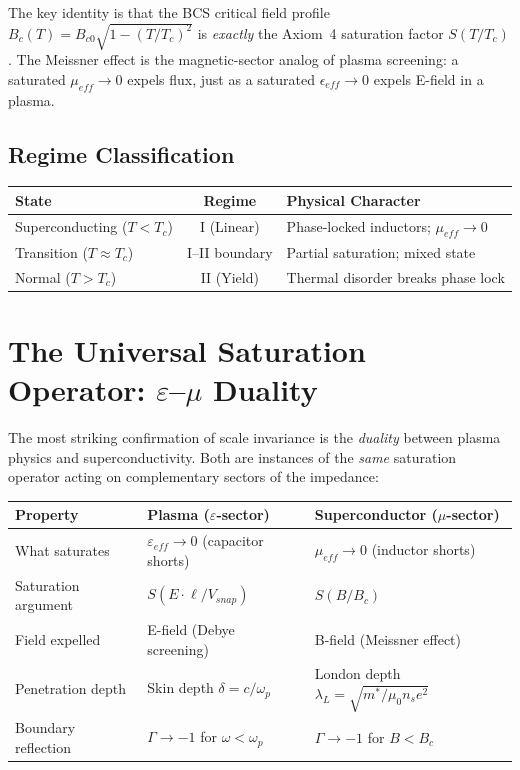 \noindent The key identity is that the BCS critical field profile $B_c(T) = B_{c0}\sqrt{1-(T/T_c)^2}$ is \emph{exactly} the Axiom~4 saturation factor $S(T/T_c)$. The Meissner effect is the magnetic-sector analog of plasma screening: a saturated $\mu_{eff} \to 0$ expels flux, just as a saturated $\epsilon_{eff} \to 0$ expels E-field in a plasma.

\subsection*{Regime Classification}
\begin{center}
\small
\renewcommand{\arraystretch}{1.2}
\begin{tabular}{lcl}
\toprule
\textbf{State} & \textbf{Regime} & \textbf{Physical Character} \\
\midrule
Superconducting ($T < T_c$) & I (Linear) & Phase-locked inductors; $\mu_{eff} \to 0$ \\
Transition ($T \approx T_c$)      & I--II boundary & Partial saturation; mixed state \\
Normal ($T > T_c$)                 & II (Yield) & Thermal disorder breaks phase lock \\
\bottomrule
\end{tabular}
\end{center}

\section{The Universal Saturation Operator: $\varepsilon$--$\mu$ Duality}
\label{sec:superconductivity_duality}

The most striking confirmation of scale invariance is the
\textit{duality} between plasma physics and superconductivity.
Both are instances of the \textit{same} saturation operator acting
on complementary sectors of the impedance:

\begin{center}
\small
\renewcommand{\arraystretch}{1.2}
\begin{tabular}{lll}
\toprule
\textbf{Property} & \textbf{Plasma ($\varepsilon$-sector)} & \textbf{Superconductor ($\mu$-sector)} \\
\midrule
What saturates      & $\varepsilon_{eff} \to 0$ (capacitor shorts)
                    & $\mu_{eff} \to 0$ (inductor shorts) \\
Saturation argument & $S(E \cdot \ell / V_{snap})$
                    & $S(B / B_c)$ \\
Field expelled      & E-field (Debye screening)
                    & B-field (Meissner effect) \\
Penetration depth   & Skin depth $\delta = c/\omega_p$
                    & London depth $\lambda_L = \sqrt{m^*/\mu_0 n_s e^2}$ \\
Boundary reflection & $\Gamma \to -1$ for $\omega < \omega_p$
                    & $\Gamma \to -1$ for $B < B_c$ \\
\bottomrule
\end{tabular}
\end{center}

